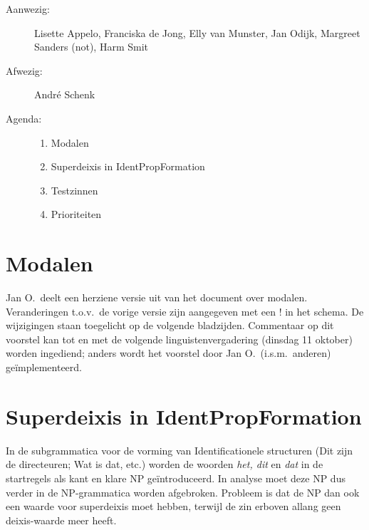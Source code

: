 

   \RosSupersedes{-}
   \MakeRosTitle
%
%
\begin{description}
\item[Aanwezig:] Lisette Appelo, Franciska de Jong, Elly van Munster,
                 Jan Odijk, Margreet Sanders (not), Harm Smit
\item[Afwezig:] Andr\'{e} Schenk
\item[Agenda:]\mbox{}
  \begin{enumerate}
  \item Modalen
  \item Superdeixis in IdentPropFormation
  \item Testzinnen
  \item Prioriteiten
  \end{enumerate}
\end{description}

\section{Modalen}
Jan O.\ deelt een herziene versie uit van het document over modalen. 
Veranderingen t.o.v.\ de vorige versie zijn aangegeven met een ! in het schema. 
De wijzigingen staan toegelicht op de volgende bladzijden. Commentaar op dit 
voorstel kan tot en met de volgende linguistenvergadering (dinsdag 11 oktober) 
worden ingediend; anders wordt het voorstel door Jan O.\ (i.s.m.\ anderen) 
ge\"{i}mplementeerd.

\section{Superdeixis in IdentPropFormation}
In de subgrammatica voor de vorming van Identificationele structuren (Dit zijn 
de directeuren; Wat is dat, etc.) worden de woorden {\em het, dit\/} en {\em 
dat\/} in de startregels als kant en klare NP ge\"{i}ntroduceerd. In analyse moet 
deze NP dus verder in de NP-grammatica worden afgebroken. Probleem is dat de NP 
dan ook een waarde voor superdeixis moet hebben, terwijl de zin erboven 
allang geen deixis-waarde meer heeft. 

